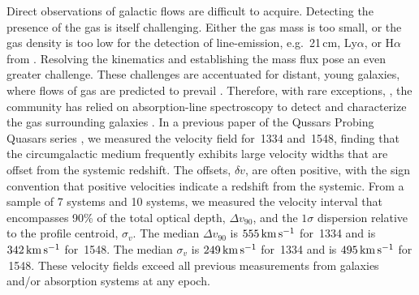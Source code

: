 \documentclass[iop]{emulateapj}
\begin{document}
Direct observations of galactic flows are difficult to acquire. Detecting the presence of 
the gas is itself challenging. Either the gas mass is too small, or the gas density is too low for 
the detection of line-emission, e.g.\ 21\,cm, Ly$\alpha$, or H$\alpha$ from . Resolving 
the kinematics and establishing the mass flux pose an even greater challenge. These challenges are 
accentuated for distant, young galaxies, where flows of gas are predicted to prevail 
\citep{Keres+09,Fumagalli+11}. Therefore, with rare exceptions, 
\citep[e.g.][]{Cantalupo+14,Hennawi+15}, the community has relied on absorption-line spectroscopy 
to detect and characterize the gas surrounding galaxies 
\citep[e.g.][]{BergeronBoisse91,Steidel+10,Prochaska+11,Tumlinson+13}. 
In a previous paper of the Qussars Probing Quasars series \citep[][, hereafter QPQ8]{QPQ8}, we 
measured the velocity field for \,1334 and \,1548, finding that the 
circumgalactic medium frequently exhibits large velocity widths that are offset from the systemic 
redshift. The offsets, $\delta v$, are often positive, with the sign convention that positive 
velocities indicate a redshift from the systemic. From a sample of 7  systems and 10 
 systems, we measured the velocity interval that encompasses 90\% of the total optical 
depth, $\Delta v_{90}$, and the $1\sigma$ dispersion relative to the profile centroid, $\sigma_v$. 
The median $\Delta v_{90}$ is $555\,{\rm km\,s^{-1}}$ for \,1334 and is 
$342\,{\rm km\,s^{-1}}$ for \,1548. The median $\sigma_v$ is $249\,{\rm km\,s^{-1}}$ for 
\,1334 and is $495\,{\rm km\,s^{-1}}$ for \,1548. These velocity fields exceed 
all previous measurements from galaxies and/or absorption systems at any epoch. 
\end{document}
